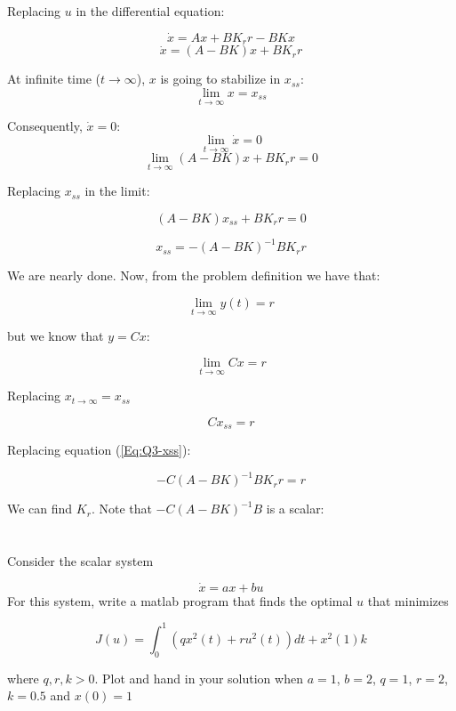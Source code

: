 \documentclass[10pt,a4paper]{article}
\begin{document}
Replacing $u$ in the differential equation:

\[ \dot{x} = Ax + BK_{r}r - BKx \]
\begin{equation} 
\dot{x} = (A-BK)x + BK_{r}r 
\label{Eq:Q3-dx}
\end{equation}

At infinite time ($t\rightarrow \infty$), $x$ is going to stabilize in $x_{ss}$:
\[ \lim_{t \rightarrow \infty} x = x_{ss} \]

Consequently, $\dot{x} = 0$:
\[ \lim_{t \rightarrow \infty}\dot{x} = 0 \]
\[ \lim_{t \rightarrow \infty} (A-BK)x + BK_{r}r = 0 \]

Replacing $x_{ss}$ in the limit:

\[ (A-BK)x_{ss} + BK_{r}r = 0 \]

\begin{equation} 
x_{ss} = -(A-BK)^{-1}BK_{r}r
\label{Eq:Q3-xss} 
\end{equation}

We are nearly done. Now, from the problem definition we have that:

\[ \lim_{t \rightarrow \infty } y(t) = r \]

but we know that $y = Cx$:

\[ \lim_{t \rightarrow \infty } Cx = r \]

Replacing $x_{t \rightarrow \infty } = x_{ss}$

\[Cx_{ss} = r\]

Replacing equation (\ref{Eq:Q3-xss}):

\[ -C(A-BK)^{-1}BK_{r}r = r \]

We can find $K_{r}$. Note that $-C(A-BK)^{-1}B$ is a scalar:
\begin{center}
\end{center}

\section{}
Consider the scalar system

\[ \dot{x} = ax + bu \]
For this system, write a matlab program that finds the optimal $u$ that minimizes

\[ J(u) = \int^{1}_{0} (qx^{2}(t) + ru^{2}(t))dt + x^{2}(1)k \]

where $q,r,k > 0$. Plot and hand in your solution when $a=1$, $b=2$, $q=1$, $r=2$, $k=0.5$ and $x(0) = 1$
\end{document}
